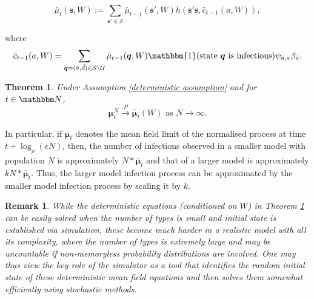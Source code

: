 \documentclass{article}
\newtheorem{theorem}{Theorem}[section]
\newtheorem{remark}{Remark}
\theoremstyle{definition}
\begin{document}
\begin{equation}
        \label{mu_definition_equation}
     \bar{\mu}_{t}(\bm{s},W) := \sum\limits_{\bm{s'} \in \mathcal S} \bar{\mu}_{t-1}({\bm{s'}},W) h(\bm{s'}\bm{s},\bar{c}_{t-1}(a,W)), \end{equation}
     
     where \[\bar{c}_{t-1}({a},W) = \sum\limits_{\bm{q}=(\tilde{a},\tilde{d}) \in \mathcal S \setminus  \mathcal U} \bar{\mu}_{t-1}(\bm{q}, W)\mathbbm{1}(\text{state }\bm{q} \text{ is infectious}) \psi_{\tilde{a},{a}} \beta_{\tilde{a}}.\]



\begin{theorem}  Under Assumption \ref{deterministic assumption} and for $t\in\mathbbm N$, 
   \[
    \bm{\mu}^N_{t} \xrightarrow{P} \bm{\bar{\mu}}_{t}(W) \text{ as } N\rightarrow\infty. 
    \]
    
    
        
        \label{deterministic_theorem}
        \end{theorem}
        
        
        In particular, if $\bm{\bar{\mu}}_t$ denotes the mean field limit of the normalised process at time $t + \log_{\rho} (\epsilon N)$, then, the number of infections observed in a smaller model with population $N$ is approximately $N* \bm{\bar{\mu}}_t$ and that of a larger model is approximately $kN* \bm{\bar{\mu}}_t$. Thus, the larger model infection process can be approximated by the smaller model infection process by scaling it by $k$.
        
        \begin{remark} {\em
        While the deterministic equations (conditioned on $W$) in Theorem \ref{deterministic_theorem}  
        can be easily solved when the number of types is small and initial state is established via simulation, these become much harder in a realistic model with all its complexity, where the number of types is extremely large and may be uncountable if non-memoryless probability distributions are involved. 
  One may thus view the key  role of the simulator as a tool that identifies the random initial state of these deterministic mean field equations 
  and then solves them somewhat efficiently using stochastic methods.}
  \end{remark}
         
\end{document}
